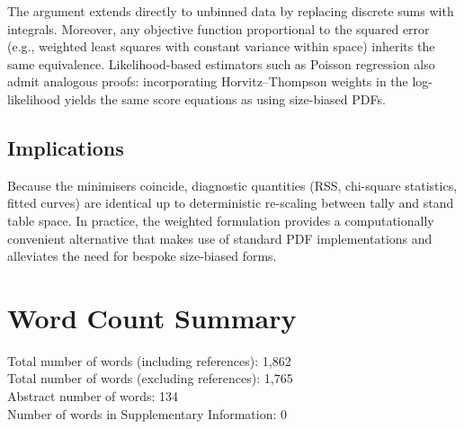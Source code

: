 \documentclass[12pt]{article}
\begin{document}
The argument extends directly to unbinned data by replacing discrete sums with
integrals. Moreover, any objective function proportional to the squared error
(e.g., weighted least squares with constant variance within space) inherits the
same equivalence. Likelihood-based estimators such as Poisson regression also
admit analogous proofs: incorporating Horvitz--Thompson weights in the log-
likelihood yields the same score equations as using size-biased PDFs.

\subsection{Implications}

Because the minimisers coincide, diagnostic quantities (RSS, chi-square
statistics, fitted curves) are identical up to deterministic re-scaling between
tally and stand table space. In practice, the weighted formulation provides a
computationally convenient alternative that makes use of standard PDF
implementations and alleviates the need for bespoke size-biased forms.


\section*{Word Count Summary}
Total number of words (including references): 1,862\\
Total number of words (excluding references): 1,765\\
Abstract number of words: 134\\
Number of words in Supplementary Information: 0



\end{document}
